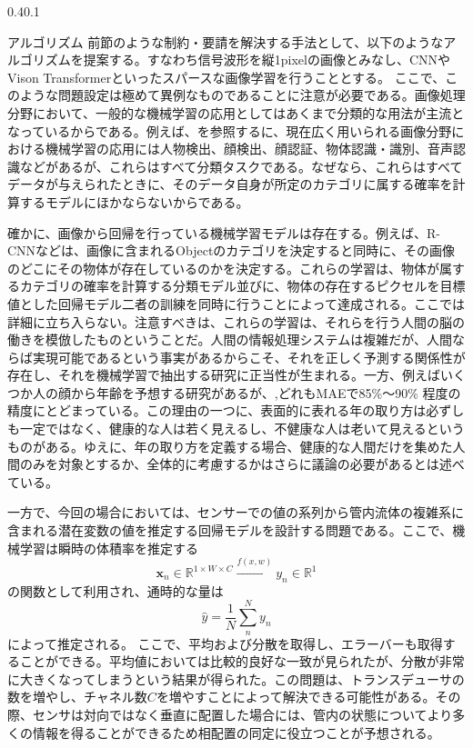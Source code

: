 \documentclass[uplatex]{suribt}
\makeatletter
\renewcommand{\subsection}{%
    \@startsection{subsection}{1}{\z@}%
    {0.4\Cvs}{0.1\Cvs}%
    {\normalfont\normalsize\headfont\raggedright}}
\makeatother
\begin{document}
\subsection{アルゴリズム}
前節のような制約・要請を解決する手法として、以下のようなアルゴリズムを提案する。すなわち信号波形を縦1pixelの画像とみなし、CNNやVison Transformerといったスパースな画像学習を行うこととする。
ここで、このような問題設定は極めて異例なものであることに注意が必要である。画像処理分野において、一般的な機械学習の応用としてはあくまで分類的な用法が主流となっているからである。例えば、\cite{Bishop:DeepLearning24}を参照するに、現在広く用いられる画像分野における機械学習の応用には人物検出、顔検出、顔認証、物体認識・識別、音声認識などがあるが、これらはすべて分類タスクである。なぜなら、これらはすべてデータが与えられたときに、そのデータ自身が所定のカテゴリに属する確率を計算するモデルにほかならないからである。\par
確かに、画像から回帰を行っている機械学習モデルは存在する。例えば、R-CNN\cite{girshick2014rich}などは、画像に含まれるObjectのカテゴリを決定すると同時に、その画像のどこにその物体が存在しているのかを決定する。これらの学習は、物体が属するカテゴリの確率を計算する分類モデル並びに、物体の存在するピクセルを目標値とした回帰モデル二者の訓練を同時に行うことによって達成される。ここでは詳細に立ち入らない。注意すべきは、これらの学習は、それらを行う人間の脳の働きを模倣したものということだ。人間の情報処理システムは複雑だが、人間ならば実現可能であるという事実があるからこそ、それを正しく予測する関係性が存在し、それを機械学習で抽出する研究に正当性が生まれる。一方、例えばいくつか人の顔から年齢を予想する研究があるが、\cite{sheoran2020age},\cite{guo2008probabilistic}どれもMAEで85\%～90\% 程度の精度にとどまっている。この理由の一つに、表面的に表れる年の取り方は必ずしも一定ではなく、健康的な人は若く見えるし、不健康な人は老いて見えるというものがある。ゆえに、年の取り方を定義する場合、健康的な人間だけを集めた人間のみを対象とするか、全体的に考慮するかはさらに議論の必要があると\cite{guo2008probabilistic}は述べている。\par
一方で、今回の場合においては、センサーでの値の系列から管内流体の複雑系に含まれる潜在変数の値を推定する回帰モデルを設計する問題である。ここで、機械学習は瞬時の体積率を推定する
\begin{equation}
    \mathbf{x}_n \in \mathbb{R}^{1\times W\times C} \stackrel{f(x,w)}{\to} y_n \in \mathbb{R}^1
\end{equation}
の関数として利用され、通時的な量は
\begin{equation}
    \hat y = \frac{1}{N}\sum_n^N y_n
\end{equation}
によって推定される。
ここで、平均および分散を取得し、エラーバーも取得することができる。平均値においては比較的良好な一致が見られたが、分散が非常に大きくなってしまうという結果が得られた。この問題は、トランスデューサの数を増やし、チャネル数$C$を増やすことによって解決できる可能性がある。その際、センサは対向ではなく垂直に配置した場合には、管内の状態についてより多くの情報を得ることができるため相配置の同定に役立つことが予想される。
\end{document}
